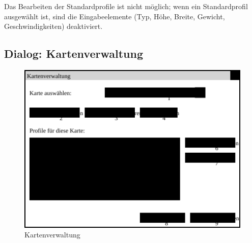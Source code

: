 \documentclass[a4paper, 11pt]{article}
\begin{document}
Das Bearbeiten der Standardprofile ist nicht möglich; wenn ein Standardprofil ausgewählt ist, sind die Eingabeelemente (Typ, Höhe, Breite, Gewicht, Geschwindigkeiten) deaktiviert.

\subsection{Dialog: Kartenverwaltung}
\begin{figure}[H]
\centering
\includegraphics[width=0.9\linewidth]{Kartenverwaltung}
\caption{Kartenverwaltung}
\label{fig:mockupkartenverwaltung}
\end{figure}
\end{document}
